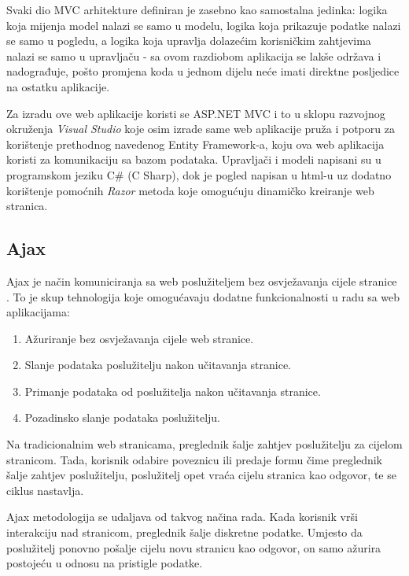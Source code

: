 \documentclass[times, utf8, zavrsni]{fer}
\begin{document}
Svaki dio MVC arhitekture definiran je zasebno kao samostalna jedinka: logika koja mijenja model nalazi se samo u modelu, logika koja prikazuje podatke nalazi se samo u pogledu, a logika koja upravlja dolazećim korisničkim zahtjevima nalazi se samo u upravljaču - sa ovom razdiobom aplikacija se lakše održava i nadograđuje, pošto promjena koda u jednom dijelu neće imati direktne posljedice na ostatku aplikacije.

Za izradu ove web aplikacije koristi se ASP.NET MVC i to u sklopu razvojnog okruženja \emph{Visual Studio} koje osim izrade same web aplikacije pruža i potporu za korištenje prethodnog navedenog Entity Framework-a, koju ova web aplikacija koristi za komunikaciju sa bazom podataka. Upravljači i modeli napisani su u programskom jeziku C\# (C Sharp), dok je pogled napisan u html-u uz dodatno korištenje pomoćnih \emph{Razor} metoda koje omogućuju dinamičko kreiranje web stranica.\clearpage

\subsection{Ajax}

Ajax je način komuniciranja sa web poslužiteljem bez osvježavanja cijele stranice \citep{ajax}.
To je skup tehnologija koje omogućavaju dodatne funkcionalnosti u radu sa web aplikacijama:
\begin{enumerate}
\item Ažuriranje bez osvježavanja cijele web stranice.
\item Slanje podataka poslužitelju nakon učitavanja stranice.
\item Primanje podataka od poslužitelja nakon učitavanja stranice.
\item Pozadinsko slanje podataka poslužitelju.
\end{enumerate}

Na tradicionalnim web stranicama, preglednik  šalje zahtjev poslužitelju za cijelom stranicom. Tada, korisnik odabire poveznicu ili predaje formu čime preglednik šalje zahtjev poslužitelju, poslužitelj opet vraća cijelu stranica kao odgovor, te se ciklus nastavlja.

Ajax metodologija se udaljava od takvog načina rada. Kada korisnik vrši interakciju nad stranicom, preglednik šalje diskretne podatke. Umjesto da poslužitelj ponovno pošalje cijelu novu stranicu kao odgovor, on samo ažurira postojeću u odnosu na pristigle podatke.\\
\end{document}
